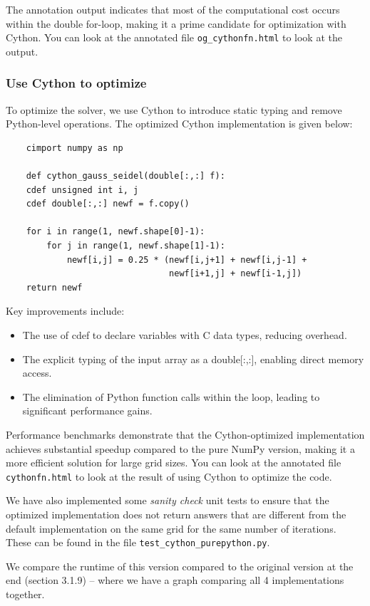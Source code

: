 \documentclass[a4paper,12pt]{article}
\begin{document}
The annotation output indicates that most of the computational cost occurs within the double for-loop, making it a prime candidate for optimization with Cython. You can look at the annotated file \verb|og_cythonfn.html| to look at the output. 

\subsubsection{Use Cython to optimize}

To optimize the solver, we use Cython to introduce static typing and remove Python-level operations. The optimized Cython implementation is given below:

\begin{verbatim}
    cimport numpy as np

    def cython_gauss_seidel(double[:,:] f):
    cdef unsigned int i, j
    cdef double[:,:] newf = f.copy()

    for i in range(1, newf.shape[0]-1):
        for j in range(1, newf.shape[1]-1):
            newf[i,j] = 0.25 * (newf[i,j+1] + newf[i,j-1] +
                                newf[i+1,j] + newf[i-1,j])
    return newf
\end{verbatim}

Key improvements include:
\begin{itemize}
    \item The use of cdef to declare variables with C data types, reducing overhead.
    \item The explicit typing of the input array as a double[:,:], enabling direct memory access.
    \item The elimination of Python function calls within the loop, leading to significant performance gains.
\end{itemize}

Performance benchmarks demonstrate that the Cython-optimized implementation achieves substantial speedup compared to the pure NumPy version, making it a more efficient solution for large grid sizes. You can look at the annotated file \verb|cythonfn.html| to look at the result of using Cython to optimize the code.

We have also implemented some \textit{sanity check} unit tests to ensure that the optimized implementation does not return answers that are different from the default implementation on the same grid for the same number of iterations. These can be found in the file \verb|test_cython_purepython.py|.

We compare the runtime of this version compared to the original version at the end (section 3.1.9) -- where we have a graph comparing all 4 implementations together. 
\end{document}
